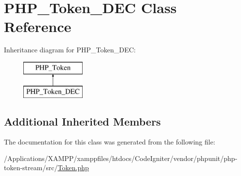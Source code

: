 \hypertarget{class_p_h_p___token___d_e_c}{}\section{P\+H\+P\+\_\+\+Token\+\_\+\+D\+EC Class Reference}
\label{class_p_h_p___token___d_e_c}
Inheritance diagram for P\+H\+P\+\_\+\+Token\+\_\+\+D\+EC\+:\begin{figure}[H]
\begin{center}
\leavevmode
\includegraphics[height=2.000000cm]{class_p_h_p___token___d_e_c}
\end{center}
\end{figure}
\subsection*{Additional Inherited Members}


The documentation for this class was generated from the following file\+:\begin{DoxyCompactItemize}
\item 
/\+Applications/\+X\+A\+M\+P\+P/xamppfiles/htdocs/\+Code\+Igniter/vendor/phpunit/php-\/token-\/stream/src/\mbox{\hyperlink{_token_8php}{Token.\+php}}\end{DoxyCompactItemize}

